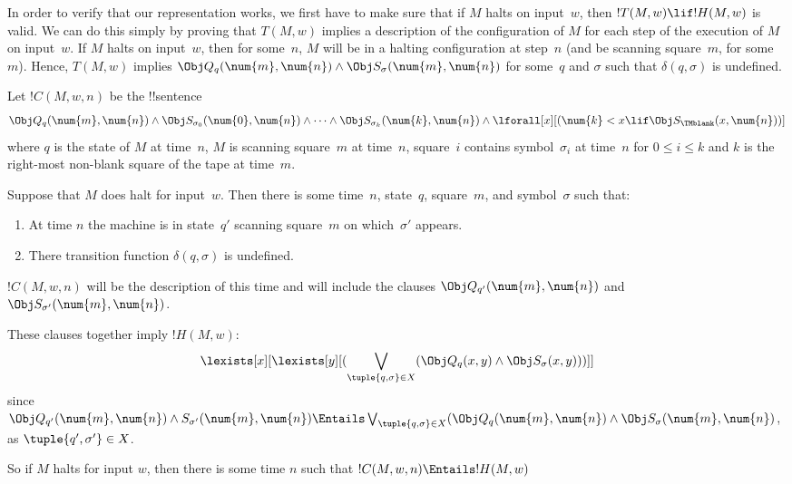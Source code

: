 \documentclass[../../../include/open-logic-section]{subfiles}
\begin{document}

\begin{explain}
In order to verify that our representation works, we first have to
make sure that if $M$ halts on input~$w$, then $!T(M, w) \lif !H(M,
w)$ is valid. We can do this simply by proving that $T(M, w)$ implies
a description of the configuration of $M$ for each step of the
execution of $M$ on input~$w$. If $M$ halts on input~$w$, then for
some~$n$, $M$ will be in a halting configuration at step~$n$ (and be
scanning square~$m$, for some $m$). Hence, $T(M, w)$ implies $\Obj
Q_q(\num{m}, \num{n}) \land \Obj S_\sigma(\num{m}, \num{n})$ for
some~$q$ and $\sigma$ such that $\delta(q, \sigma)$ is undefined.
\end{explain}

\begin{defn} 
Let $!C(M, w, n)$ be the !!{sentence}
\[ 
\Obj Q_q(\num{m}, \num{n}) \land \Obj S_{\sigma_0}(\num{0}, \num{n})
\land \dots \land \Obj S_{\sigma_k}(\num{k}, \num{n}) \land
\lforall[x][(\num{k} < x \lif \Obj S_\TMblank(x, \num{n}))]
\] 
where $q$ is the state
of $M$ at time~$n$, $M$ is scanning square~$m$ at time~$n$, square~$i$
contains symbol~$\sigma_i$ at time~$n$ for $0 \le i \le k$ and $k$ is the
right-most non-blank square of the tape at time~$m$. 
\end{defn}

Suppose that $M$ does halt for input~$w$. Then there is some
time~$n$, state~$q$, square~$m$, and symbol~$\sigma$ such that:
\begin{enumerate} 
\item At time $n$ the machine is in state~$q'$ scanning square~$m$ on
  which~$\sigma'$ appears.
\item There transition function $\delta(q, \sigma)$ is undefined.
\end{enumerate}

$!C(M, w, n)$ will be the description of this time and will include
the clauses $\Obj Q_{q'}(\num{m}, \num{n})$ and $\Obj
S_{\sigma'}(\num{m}, \num{n})$.

These clauses together imply $!H(M, w)$:
\[
\lexists[x][\lexists[y][(\bigvee_{\tuple{q, \sigma} \in
      X}(\Obj Q_q(x, y) \land \Obj S_\sigma(x, y)))]]
\]
since $\Obj Q_{q'}(\num{m}, \num{n}) \land S_{\sigma'}(\num{m},
\num{n}) \Entails \bigvee_{\tuple{q, \sigma} \in X} (\Obj Q_q(\num{m},
\num{n}) \land \Obj S_{\sigma}(\num{m}, \num{n})$, as
$\tuple{q',\sigma'} \in X$.

So if $M$ halts for input $w$, then there is some time $n$ such that
$!C(M, w, n) \Entails !H(M,w)$
\end{document}
